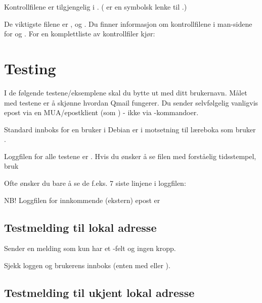 Kontrollfilene er tilgjengelig i . ( er en symbolsk
lenke til .) 

De viktigste filene er ,  og . Du finner informasjon 
om kontrollfilene i man-sidene for  og . For en komplettliste
av kontrollfiler kjør:


\section{Testing}

I de følgende testene/eksemplene skal du bytte ut  med ditt brukernavn.
Målet med testene er å skjønne hvordan Qmail fungerer. Du sender selvfølgelig vanligvis
epost via en MUA/epostklient (som ) - ikke via -kommandoer.

\begin{remark}
Standard innboks for en bruker i Debian er  i motsetning
til læreboka som bruker .

\end{remark}

Loggfilen for alle testene er . Hvis du ønsker å se filen
med forståelig tidsstempel, bruk


Ofte ønsker du bare å se de f.eks. 7 siste linjene i loggfilen:


NB! Loggfilen for innkommende (ekstern) epost er 

\subsection*{Testmelding til lokal adresse}

Sender en melding som kun har et -felt og ingen kropp.


Sjekk loggen og brukerens innboks (enten med  eller ).

\subsection*{Testmelding til ukjent lokal adresse}

